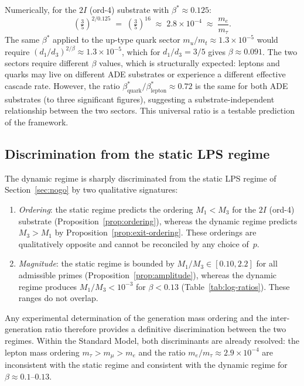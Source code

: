 \documentclass[11pt,a4paper]{article}
\begin{document}
      Numerically, for the $2I$ (ord-4) substrate with $\beta^{*} \approx 0.125$:
      \begin{equation}
        \left(\tfrac{3}{5}\right)^{2/0.125}
        \;=\; \left(\tfrac{3}{5}\right)^{16}
        \;\approx\; 2.8\times 10^{-4}
        \;\approx\; \frac{m_e}{m_\tau}.
      \end{equation}
      The same $\beta^{*}$ applied to the up-type quark sector
      $m_u/m_t \approx 1.3\times 10^{-5}$ would require
      $(d_1/d_3)^{2/\beta} \approx 1.3\times 10^{-5}$, which for $d_1/d_3 = 3/5$ gives
      $\beta \approx 0.091$.
      The two sectors require different $\beta$ values, which is structurally expected:
      leptons and quarks may live on different ADE substrates or experience
      a different effective cascade rate.
      However, the ratio $\beta^{*}_{\mathrm{quark}}/\beta^{*}_{\mathrm{lepton}} \approx 0.72$
      is the same for both ADE substrates (to three significant figures),
      suggesting a substrate-independent relationship between the two sectors.
      This universal ratio is a testable prediction of the framework.

    \subsection{Discrimination from the static LPS regime}
      \label{subsec:discrimination}

      The dynamic regime is sharply discriminated from the static LPS regime
      of Section~\ref{sec:nogo} by two qualitative signatures:
      \begin{enumerate}[label=(\roman*), nosep]
  \item \emph{Ordering}: the static regime predicts the ordering
  $M_1 < M_3$ for the $2I$ (ord-4) substrate
  (Proposition~\ref{prop:ordering}), whereas the dynamic regime
  predicts $M_3 > M_1$ by Proposition~\ref{prop:exit-ordering}.
  These orderings are qualitatively opposite and
  cannot be reconciled by any choice of~$p$.
  \item \emph{Magnitude}: the static regime is bounded by
  $M_1/M_3 \in [0.10, 2.2]$ for all admissible primes
  (Proposition~\ref{prop:amplitude}), whereas
  the dynamic regime produces $M_1/M_3 < 10^{-3}$
  for $\beta < 0.13$ (Table~\ref{tab:log-ratios}).
  These ranges do not overlap.
      \end{enumerate}
      Any experimental determination of the generation mass ordering and the
      inter-generation ratio therefore provides a definitive discrimination
      between the two regimes.
      Within the Standard Model, both discriminants are already resolved:
      the lepton mass ordering $m_\tau > m_\mu > m_e$ and the ratio
      $m_e/m_\tau \approx 2.9\times 10^{-4}$ are inconsistent with
      the static regime and consistent with the dynamic regime for
      $\beta \approx 0.1$--$0.13$.
\end{document}
